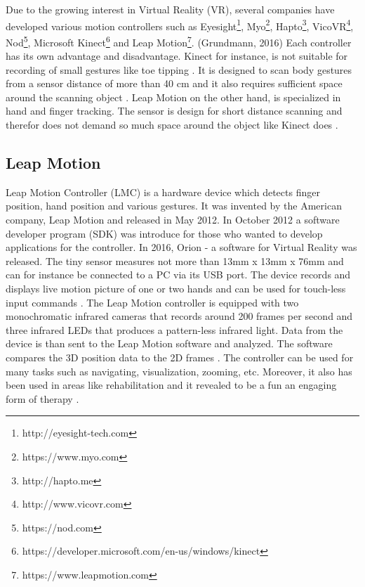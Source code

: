 Due to the growing interest in Virtual Reality (VR), several companies have developed various motion controllers such as Eyesight\footnote{http://eyesight-tech.com}, Myo\footnote{https://www.myo.com}, Hapto\footnote{http://hapto.me}, VicoVR\footnote{http://www.vicovr.com}, Nod\footnote{https://nod.com}, Microsoft Kinect\footnote{https://developer.microsoft.com/en-us/windows/kinect} and Leap Motion\footnote{https://www.leapmotion.com}. (Grundmann, 2016)
Each controller has its own advantage and disadvantage. Kinect for instance, is not suitable for recording of small gestures like toe tipping \cite{Galna2014}. It is designed to scan body gestures from a sensor distance of more than 40 cm and it also requires sufficient space around the scanning object \cite{Weinberger2015}.
Leap Motion on the other hand, is specialized in hand and finger tracking. The sensor is design for short distance scanning and therefor does not demand so much space around the object like Kinect does \cite{Grundmann2016}.


\subsection{Leap Motion}
Leap Motion Controller (LMC) is a hardware device which detects finger position, hand position and various gestures. It was invented by the American company, Leap Motion and released in May 2012. In October 2012 a software developer program (SDK) was introduce for those who wanted to develop applications for the controller. In 2016, Orion - a software for Virtual Reality was released. The tiny sensor measures not more than 13mm x 13mm x 76mm and can for instance be connected to a PC via its USB port. The device records and displays live motion picture of one or two hands \cite{Smeragliuolo2016} and can be used for touch-less input commands  \cite{Weichert2013}.
The Leap Motion controller is equipped with two monochromatic infrared cameras that records around 200 frames per second  and three infrared LEDs that produces a pattern-less infrared light. Data from the device is than sent to the Leap Motion software and analyzed. The software compares the 3D position data to the 2D frames \cite{Grundmann2016}.
The controller can be used for many tasks such as navigating, visualization, zooming, etc. Moreover, it also has been used in areas like rehabilitation and it revealed to be a fun an engaging form of therapy \cite{Smeragliuolo2016}.


